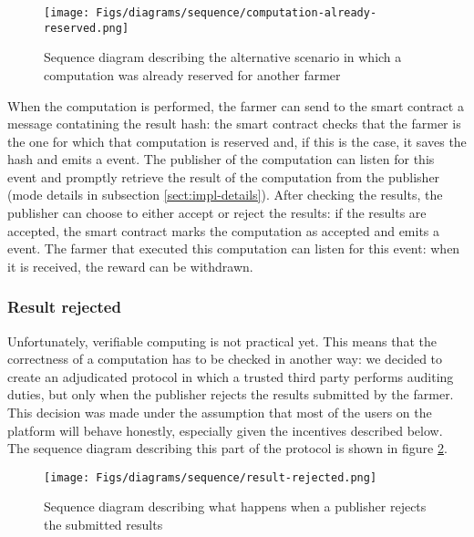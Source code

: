 \begin{figure}
\caption[Computation already reserved scenario]{Sequence diagram describing the alternative scenario in which a computation was already reserved for another farmer}
\label{figs:sequence-already-assigned}
\begin{center}
    \texttt{[image: Figs/diagrams/sequence/computation-already-reserved.png]}
\end{center}
\end{figure}

When the computation is performed, the farmer can send to the smart contract a message contatining the result hash: the smart contract checks that the farmer is the one for which that computation is reserved and, if this is the case, it saves the hash and emits a  event. The publisher of the computation can listen for this event and promptly retrieve the result of the computation from the publisher (mode details in subsection \ref{sect:impl-details}). After checking the results, the publisher can choose to either accept or reject the results: if the results are accepted, the smart contract marks the computation as accepted and emits a  event. The farmer that executed this computation can listen for this event: when it is received, the reward can be withdrawn.

\subsubsection{Result rejected}
Unfortunately, verifiable computing is not practical yet. This means that the correctness of a computation has to be checked in another way: we decided to create an adjudicated protocol in which a trusted third party performs auditing duties, but only when the publisher rejects the results submitted by the farmer. This decision was made under the assumption that most of the users on the platform will behave honestly, especially given the incentives described below. The sequence diagram describing this part of the protocol is shown in figure \ref{figs:result-rejected}.

\begin{figure}
\caption[Result rejected scenario]{Sequence diagram describing what happens when a publisher rejects the submitted results}
\label{figs:result-rejected}
\begin{center}
    \texttt{[image: Figs/diagrams/sequence/result-rejected.png]}
\end{center}
\end{figure}

